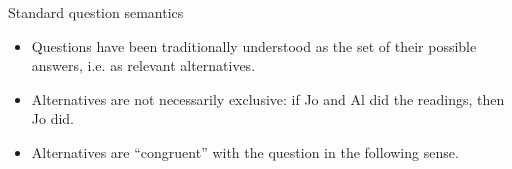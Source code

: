 \documentclass[10pt]{beamer}
\begin{document}
\begin{frame}{Standard question semantics}
	\begin{itemize}
		\item Questions have been traditionally understood as the set of their possible answers, i.e. as relevant alternatives.
	\end{itemize}
	\begin{exe}
	\end{exe}
	\begin{itemize}
		\item Alternatives are not necessarily exclusive: if Jo and Al did the readings, then Jo did.
		\item Alternatives are ``congruent'' with the question in the following sense.
	\end{itemize}
	\begin{exe}
		\label{ex:qa-congruence}
	\end{exe}
\end{frame}
\end{document}
